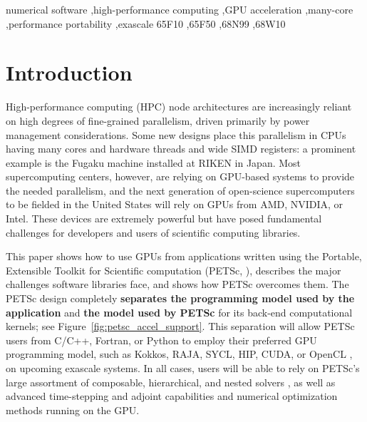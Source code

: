 \documentclass[5p,times]{elsarticle}
\begin{document}
\begin{frontmatter}
\begin{keyword}
numerical software \sep high-performance computing \sep GPU acceleration \sep many-core \sep performance portability \sep exascale %
\MSC[2010] 65F10 \sep 65F50 \sep 68N99 \sep 68W10
\end{keyword}

\end{frontmatter}

\linenumbers

\section{Introduction}

High-performance computing (HPC) node architectures are increasingly reliant on
high degrees of fine-grained parallelism, 
driven primarily by power management considerations.
Some new designs place this parallelism in CPUs having many 
cores and hardware threads and wide SIMD registers:
a prominent example is the Fugaku machine installed at RIKEN in Japan.
Most supercomputing centers, however, are relying on GPU-based systems to provide the
needed parallelism, and the next generation of open-science supercomputers to be fielded in
the United States will rely on GPUs from AMD, NVIDIA, or Intel.
These devices are extremely powerful but have posed fundamental challenges for developers and
users of scientific computing libraries.

This paper shows how to use GPUs from applications written using the
Portable, Extensible Toolkit for Scientific computation (PETSc,
\cite{petsc-user-ref}), describes
 the major challenges software libraries face, and shows how PETSc overcomes them.
The PETSc design completely {\bf separates the programming
model used by the application} and {\bf the model used by PETSc}
for its back-end computational kernels; see
Figure~\ref{fig:petsc_accel_support}.
This separation  will allow PETSc users from C/C++, Fortran, or Python to employ their preferred 
GPU programming model, such as Kokkos, RAJA, SYCL, HIP, CUDA, 
or OpenCL \cite{KOKKOS,RAJA,SYCL,CUDA,HIP,OPENCL}, on 
upcoming exascale systems.
%  
In all cases, users will be able to rely on PETSc's large assortment of composable, hierarchical, and nested
solvers \cite{bkmms2012}, as well as advanced time-stepping and adjoint
capabilities and numerical optimization methods running on the GPU.
\end{document}
